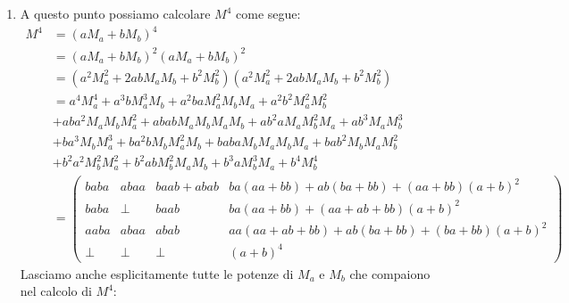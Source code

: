 \begin{ex}
\begin{sol}
\begin{enumerate}
\[
M_b^2 =
\begin{pmatrix}
    0 & 0 & 0 & 1 \\
    0 & 0 & 0 & 1 \\
    0 & 0 & 0 & 1 \\
    0 & 0 & 0 & 1
\end{pmatrix} \quad
M_b^3 =
\begin{pmatrix}
    0 & 0 & 0 & 1 \\
    0 & 0 & 0 & 1 \\
    0 & 0 & 0 & 1 \\
    0 & 0 & 0 & 1
\end{pmatrix}
\]
e abbiamo che 
$$
M_a^k = M_b^k=
\begin{pmatrix}
     0 & 0 & 0 & 1 \\
    0 & 0 & 0 & 1 \\
    0 & 0 & 0 & 1 \\
    0 & 0 & 0 & 1
\end{pmatrix}
$$
per ogni $k \ge 2$.
\item A questo punto possiamo calcolare $M^4$ come segue:
\[
\begin{aligned}
M^4&=    (aM_a + bM_b)^4 
\\&= (aM_a + bM_b)^2  (aM_a + bM_b)^2
\\&= (a^2M_a^2 + 2abM_aM_b + b^2M_b^2)(a^2M_a^2 + 2abM_aM_b + b^2M_b^2)
\\&= a^4 M_a^4 + a^3b M_a^3 M_b + a^2ba M_a^2 M_b M_a + a^2b^2 M_a^2 M_b^2 \\
&+ aba^2 M_a M_b M_a^2 + abab M_a M_b M_a M_b + ab^2a M_a M_b^2 M_a + ab^3 M_a M_b^3 \\
&+ ba^3 M_b M_a^3 + ba^2b M_b M_a^2 M_b + baba M_b M_a M_b M_a + bab^2 M_b M_a M_b^2 \\
&+ b^2a^2 M_b^2 M_a^2 + b^2ab M_b^2 M_a M_b + b^3a M_b^3 M_a + b^4 M_b^4
\\ &=
\begin{pmatrix}
    baba & abaa & baab + abab & ba(aa+bb) + ab(ba+bb) + (aa+bb)(a+b)^2 \\
    baba & \bot & baab & ba(aa+bb) + (aa+ab+bb)(a+b)^2 \\
    aaba & abaa & abab & aa(aa+ab+bb) + ab(ba+bb) + (ba+bb)(a+b)^2 \\
    \bot & \bot & \bot & (a+b)^4
\end{pmatrix}
\end{aligned}
\]
Lasciamo anche esplicitamente tutte le potenze di $M_a$ e $M_b$ che compaiono nel calcolo di $M^4$:
\begin{align*}

\end{align*}
\end{enumerate}
\end{sol}
\end{ex}
